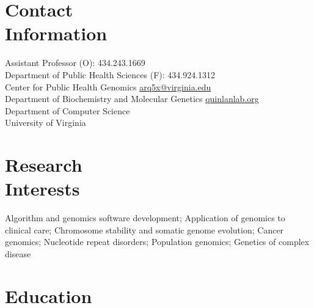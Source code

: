 \documentclass[margin,line]{cv}
\begin{document}
\begin{resume}
    \section{\mysidestyle Contact\\Information}
    Assistant Professor                                                                     \hfill (O): 434.243.1669\\%
    Department of Public Health Sciences                                                    \hfill (F): 434.924.1312\\%
    Center for Public Health Genomics                                                \hfill \url{arq5x@virginia.edu}\\%
    Department of Biochemistry and Molecular Genetics                                 \hfill    \url{quinlanlab.org}\\%
    Department of Computer Science                                                                            \hfill\\%
    University of Virginia                                                                                   \hfill \\%

    \section{\mysidestyle Research\\Interests}

    Algorithm and genomics software development;
    Application of genomics to clinical care; 
    Chromosome stability and somatic genome evolution;  
    Cancer genomics;
    Nucleotide repeat disorders; 
    Population genomics; 
    Genetics of complex disease 

    \section{\mysidestyle Education}


\end{resume}
\end{document}
